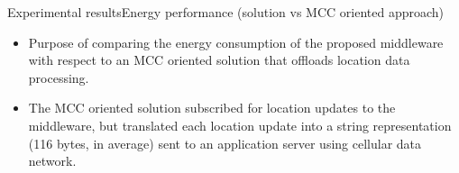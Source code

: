 \documentclass[8pt,xcolor={dvipsnames},handout]{beamer}
\begin{document}
\begin{frame}{Experimental results}{Energy performance (solution vs MCC oriented approach)}
{
\small{}
\begin{itemize}
  \item Purpose of comparing the energy consumption of the proposed middleware with respect to an MCC oriented solution that offloads location data processing.
  \item The MCC oriented solution subscribed for location updates to the middleware, but translated each location update into a string representation (116 bytes, in average) sent to an application server using cellular data network.
\end{itemize}
}

\begin{table}
\centering
{}
\end{table}
\end{frame}
\end{document}
